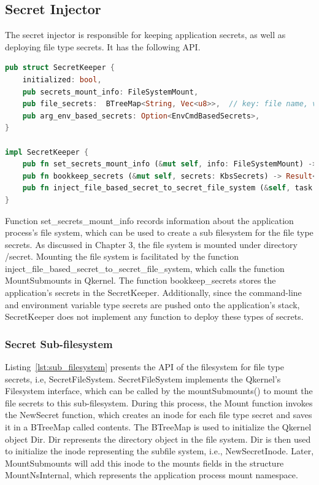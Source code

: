 \subsection{Secret Injector}
The secret injector is responsible for keeping application secrets, as well as deploying file type secrets. It has the following API. 
\begin{lstlisting}[language=rust, caption= API for Secret Injector, label={lst:Secret_injector}]
pub struct SecretKeeper {
    initialized: bool,
    pub secrets_mount_info: FileSystemMount,
    pub file_secrets:  BTreeMap<String, Vec<u8>>,  // key: file name, value: secret
    pub arg_env_based_secrets: Option<EnvCmdBasedSecrets>,
}

impl SecretKeeper {
    pub fn set_secrets_mount_info (&mut self, info: FileSystemMount) -> Result<()>
    pub fn bookkeep_secrets (&mut self, secrets: KbsSecrets) -> Result<()>
    pub fn inject_file_based_secret_to_secret_file_system (&self, task: &Task) -> Result<()>
}   
\end{lstlisting}

Function set\_secrets\_mount\_info records information about the application process's file system, which can be used to create a sub filesystem for the file type secrets. As discussed in Chapter 3, the file system is mounted under directory /secret. Mounting the file system is facilitated by the function
inject\_file\_based\_secret\_to\_secret\_file\_system, which calls the function MountSubmounts in Qkernel. The function bookkeep\_secrets stores the application's secrets in the SecretKeeper. Additionally, since the command-line and environment variable type secrets are pushed onto the application's 
stack,  SecretKeeper does not implement any function to deploy these types of secrets.
\subsubsection{Secret Sub-filesystem}
Listing~\ref{lst:sub_filesystem} presents the API of the filesystem for file type secrets, i.e, SecretFileSystem. SecretFileSystem implements the  Qkernel's Filesystem interface, which can be called by the mountSubmounts() to mount the file secrets to this sub-filesystem.  During this process, 
the Mount function invokes the NewSecret function, which creates an inode for each file type secret and saves it in a BTreeMap called contents. The BTreeMap is used to initialize the Qkernel object Dir. Dir represents the directory object in the file system. Dir is then used to initialize the inode 
representing the subfile system, i.e., NewSecretInode. Later, MountSubmounts will add this inode to the mounts fields in the structure MountNsInternal, which represents the application process mount namespace.

